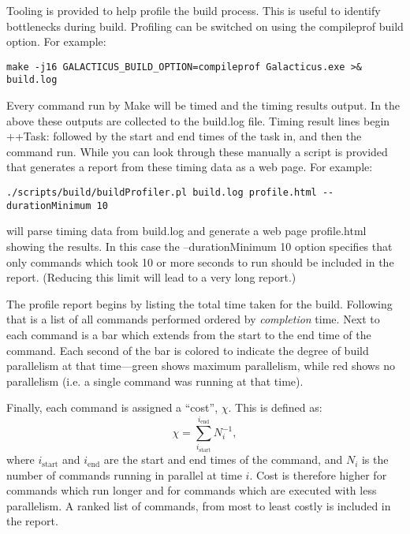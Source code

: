 Tooling is provided to help profile the build process. This is useful to identify bottlenecks during build. Profiling can be switched on using the {\normalfont \ttfamily compileprof} build option. For example:
\begin{verbatim}
make -j16 GALACTICUS_BUILD_OPTION=compileprof Galacticus.exe >& build.log
\end{verbatim}
Every command run by {\normalfont \ttfamily Make} will be timed and the timing results output. In the above these outputs are collected to the {\normalfont \ttfamily build.log} file. Timing result lines begin {\normalfont \ttfamily ++Task:} followed by the start and end times of the task in, and then the command run. While you can look through these manually a script is provided that generates a report from these timing data as a web page. For example:
\begin{verbatim}
./scripts/build/buildProfiler.pl build.log profile.html --durationMinimum 10
\end{verbatim}
will parse timing data from {\normalfont \ttfamily build.log} and generate a web page {\normalfont \ttfamily profile.html} showing the results. In this case the {\normalfont \ttfamily --durationMinimum 10} option specifies that only commands which took 10 or more seconds to run should be included in the report. (Reducing this limit will lead to a very long report.)

The profile report begins by listing the total time taken for the build. Following that is a list of all commands performed ordered by \emph{completion} time. Next to each command is a bar which extends from the start to the end time of the command. Each second of the bar is colored to indicate the degree of build parallelism at that time---green shows maximum parallelism, while red shows no parallelism (i.e. a single command was running at that time).

Finally, each command is assigned a ``cost'', $\chi$. This is defined as:
\begin{equation}
  \chi = \sum_{i_\mathrm{start}}^{i_\mathrm{end}} N_i^{-1},
\end{equation}
where $i_\mathrm{start}$ and $i_\mathrm{end}$ are the start and end times of the command, and $N_i$ is the number of commands running in parallel at time $i$. Cost is therefore higher for commands which run longer and for commands which are executed with less parallelism. A ranked list of commands, from most to least costly is included in the report.